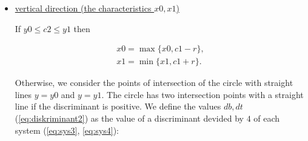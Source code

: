 \documentclass{report}
\begin{document}
\begin{itemize}
		{\bfseries Note:} we define the default intersection points for the algorithm to work correctly as:
		\begin{equation}
			\begin{gathered}
			l1 = r1 =  \infty,\\
			l2 = r2 = -\infty.
			\label{eq:lrinf}
			\end{gathered}
		\end{equation}
		
		We check the sign of $dl, dr$ and find the intersection points:
			
		\begin{equation}
			\begin{cases}
			     dl > 0,\\ 
				l1 = c2 - \sqrt {dl},\\
				l2 = c2 + \sqrt {dl}.
				\label{eq:l1l2}
			\end{cases}
		 \end{equation}
	 	
		\begin{equation}
			\begin{cases}
				dr > 0,\\ 
				r1 = c2 - \sqrt {dr},\\
				r2 = c2 + \sqrt {dr}.
				\label{eq:r1r2}
			\end{cases}
		\end{equation}
			
		We define the characteristics of rectangle as:
			
		\begin{equation}
			\begin{gathered}
				y0 = \max\{y0, \min\{l1, r1\}\},\\
				y1 = \min\{y1, \max\{l2, r2\}\}.
			\end{gathered}
		\end{equation}
				
		\item \underline {vertical direction (the characteristics $x0, x1$) }
			
		If   $y0 \le c2 \le y1$ then
			
		\begin{equation}
			\begin{gathered}
				x0 = \max\{x0, c1-r\},\\
				x1 = \min\{x1, c1+r\}.
			\end{gathered}
		\end{equation}
	
		Otherwise, we consider the points of intersection of the circle with straight lines $y = y0$ and $y = y1$. The circle has two intersection points with a straight line if the discriminant is positive. We define the values $db, dt$ (\ref{eq:diskriminant2}) as the value of a discriminant devided by  $4$ of each system (\ref{eq:sys3}, \ref{eq:sys4}):
			

\end{itemize}
\end{document}
